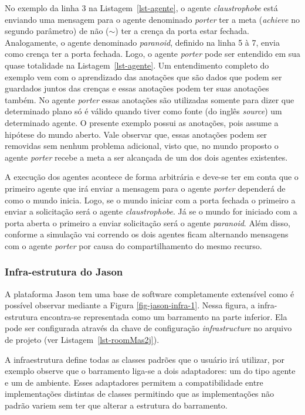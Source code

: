 No exemplo da linha 3 na Listagem~\ref{lst-agente}, o agente
\emph{claustrophobe} está enviando uma mensagem para o agente denominado \emph{porter}
ter a meta (\emph{achieve} no segundo parâmetro) de não ($\sim$) ter a crença
da porta estar fechada. Analogamente, o agente denominado \emph{paranoid}, definido
na linha 5 à 7, envia como crença ter a porta fechada. Logo, o agente \emph{porter} pode ser entendido
em sua quase totalidade na Listagem~\ref{lst-agente}. Um entendimento completo
do exemplo vem com o aprendizado das anotações que são dados que podem
ser guardados juntos das crenças e essas anotações podem ter suas anotações também.
No agente \emph{porter} essas anotações são utilizadas somente
para dizer que determinado plano só é válido quando tiver como fonte 
(do inglês \emph{source}) um determinado agente. O presente exemplo possui
as anotações, pois assume a hipótese do mundo aberto. Vale observar que, essas
anotações podem ser removidas sem nenhum problema adicional, visto que, no
mundo proposto o agente \emph{porter} recebe a meta a ser alcançada de um dos
dois agentes existentes.

A execução dos agentes acontece de forma arbitrária e deve-se ter em conta
que o primeiro agente que irá enviar a mensagem para o agente \emph{porter} dependerá
de como o mundo inicia. Logo, se o mundo iniciar com a porta fechada o primeiro
a enviar a solicitação será o agente \emph{claustrophobe}. Já se o mundo for iniciado
com a porta aberta o primeiro a enviar solicitação será o agente \emph{paranoid}.
Além disso, conforme a simulação vai correndo os dois agentes ficam alternando
mensagens com o agente \emph{porter} por causa do compartilhamento do mesmo recurso.

\subsubsection{Infra-estrutura do Jason} \label{sec-jason-architecture}

A plataforma Jason tem uma base de software completamente extensível como
é possível observar mediante a Figura \ref{fig-jason-infra-1}.
Nessa figura, a infra-estrutura encontra-se representada como um barramento
na parte inferior. Ela pode ser configurada através da chave de configuração
\emph{infrastructure} no arquivo de projeto (ver Listagem~\ref{lst-roomMas2j}).

A infraestrutura define todas as classes padrões que o usuário irá utilizar,
por exemplo observe que o barramento liga-se a dois adaptadores: um do tipo
agente e um de ambiente. Esses adaptadores permitem a compatibilidade entre
implementações distintas de classes permitindo que as implementações não
padrão variem sem ter que alterar a estrutura do barramento.

